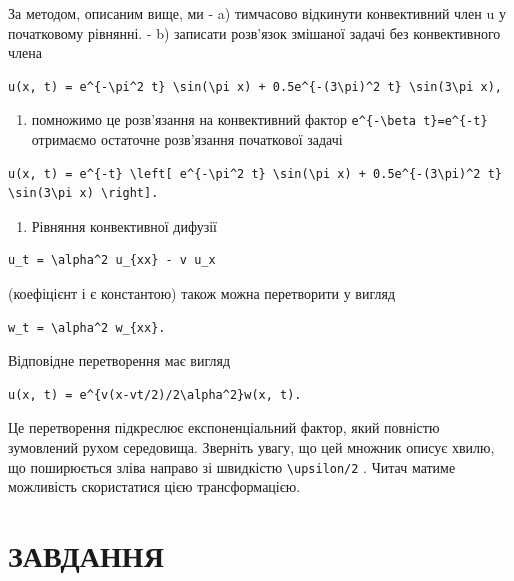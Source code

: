 \documentclass[
  ukrainian,
]{article}
\providecommand{\tightlist}{%
  \setlength{\itemsep}{0pt}\setlength{\parskip}{0pt}}
\begin{document}
За методом, описаним вище, ми - a) тимчасово відкинути конвективний член
u у початковому рівнянні. - b) записати розв'язок змішаної задачі без
конвективного члена

\begin{verbatim}
u(x, t) = e^{-\pi^2 t} \sin(\pi x) + 0.5e^{-(3\pi)^2 t} \sin(3\pi x),
\end{verbatim}

\begin{enumerate}
\def\labelenumi{\alph{enumi})}
\setcounter{enumi}{2}
\tightlist
\item
  помножимо це розв'язання на конвективний фактор
  \texttt{e\^{}\{-\textbackslash{}beta\ t\}=e\^{}\{-t\}} отримаємо
  остаточне розв'язання початкової задачі
\end{enumerate}

\begin{verbatim}
u(x, t) = e^{-t} \left[ e^{-\pi^2 t} \sin(\pi x) + 0.5e^{-(3\pi)^2 t} \sin(3\pi x) \right].
\end{verbatim}

\begin{enumerate}
\def\labelenumi{\arabic{enumi}.}
\setcounter{enumi}{1}
\tightlist
\item
  Рівняння конвективної дифузії
\end{enumerate}

\begin{verbatim}
u_t = \alpha^2 u_{xx} - v u_x
\end{verbatim}

(коефіцієнт і є константою) також можна перетворити у вигляд

\begin{verbatim}
w_t = \alpha^2 w_{xx}.
\end{verbatim}

Відповідне перетворення має вигляд

\begin{verbatim}
u(x, t) = e^{v(x-vt/2)/2\alpha^2}w(x, t).
\end{verbatim}

Це перетворення підкреслює експоненціальний фактор, який повністю
зумовлений рухом середовища. Зверніть увагу, що цей множник описує
хвилю, що поширюється зліва направо зі швидкістю
\texttt{\textbackslash{}upsilon/2} . Читач матиме можливість
скористатися цією трансформацією.

\section{ЗАВДАННЯ}\label{ux437ux430ux432ux434ux430ux43dux43dux44f-2}
\end{document}
